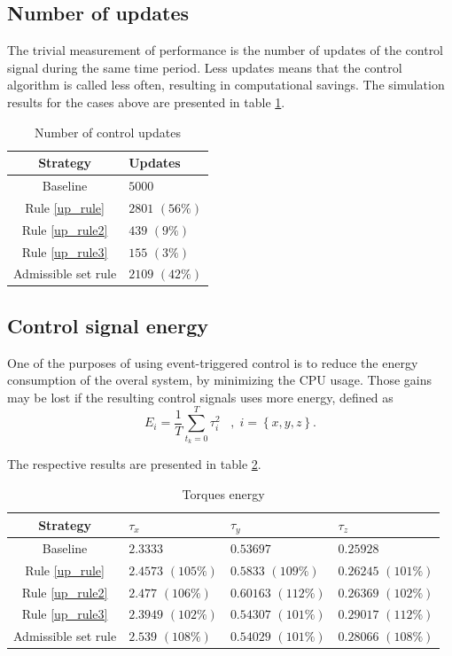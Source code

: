 \documentclass{article}
\begin{document}
		\subsection{Number of updates}
			The trivial measurement of performance is the number of updates of the control signal during the same time period. Less updates means that the control algorithm is called less often, resulting in computational savings. The simulation results for the cases above are presented in table \ref{tab:ticks}.
			\begin{table}[ht]
				\centering
				\begin{tabular}{|c|l|}
					\hline
					Strategy & Updates \\
					\hline
					Baseline & $5000$ \\
					\hline
					Rule \eqref{up_rule} & $2801$ $(56 \%)$ \\
					\hline
					Rule \eqref{up_rule2} & $439$ $(9 \%)$ \\
					\hline
					Rule \eqref{up_rule3} & $155$ $(3 \%)$ \\
					\hline
					Admissible set rule & $2109$ $(42 \%)$\\
					\hline
				\end{tabular}
				\caption{Number of control updates}
				\label{tab:ticks}
			\end{table}
		
		\subsection{Control signal energy}
			One of the purposes of using event-triggered control is to reduce the energy consumption of the overal system, by minimizing the CPU usage. Those gains may be lost if the resulting control signals uses more energy, defined as
			\[
				E_i = \frac{1}{T}\sum_{t_k=0}^T \tau_i^2\;\;\; , \; i=\left \{x,y,z \right \}.
			\]
			
			The respective results are presented in table \ref{tab:energy}.
			\begin{table}[ht]
				\centering
				\begin{tabular}{|c|l|l|l|}
					\hline
					Strategy & $\tau_x$ & $\tau_y$ & $\tau_z$ \\
					\hline
					Baseline & $2.3333$ & $0.53697$ & $0.25928$ \\
					\hline
					Rule \eqref{up_rule} & $2.4573$ $(105 \%)$ & $0.5833$ $( 109\%)$ & $0.26245$ $( 101\%)$  \\
					\hline
					Rule \eqref{up_rule2} & $2.477$ $(106 \%)$ & $0.60163$ $(112 \%)$ & $0.26369$ $(102 \%)$ \\
					\hline
					Rule \eqref{up_rule3} & $2.3949$ $(102 \%)$ & $0.54307$ $( 101\%)$ & $0.29017$ $( 112 \%)$ \\
					\hline
					Admissible set rule & $2.539$ $(108 \%)$ & $0.54029$ $(101 \%)$ & $0.28066$ $( 108\%)$\\
					\hline
				\end{tabular}
				\caption{Torques energy}
				\label{tab:energy}
			\end{table}
	
\end{document}
